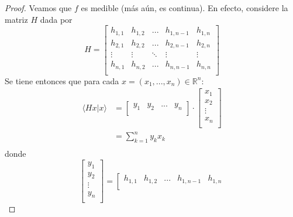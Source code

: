 \documentclass[12pt]{report}
\theoremstyle{largebreak}
\newcommand\pint[2]{\ensuremath{\langle#1| #2\rangle}}
\begin{document}
    \begin{proof}
        Veamos que $f$ es medible (más aún, es continua). En efecto, considere la matriz $H$ dada por
        \begin{equation*}
            H=\left[\begin{array}{ccccc}
                h_{1,1} & h_{1,2} & ... & h_{1,n-1} & h_{1,n}\\
                h_{2,1} & h_{2,2} & ... & h_{2,n-1} & h_{2,n}\\
                \vdots & \vdots & \ddots & \vdots & \vdots \\
                h_{n,1} & h_{n,2} & ... & h_{n,n-1} & h_{n,n}\\
            \end{array}\right]
        \end{equation*}
        Se tiene entonces que para cada $x=(x_1,...,x_n)\in\mathbb{R}^n$:
        \begin{equation*}
            \begin{split}
                \pint{Hx}{x}&=\left[
                    \begin{array}{cccc}
                        y_1 & y_2 & ... & y_n\\
                    \end{array}
                \right]\cdot\left[\begin{array}{c}
                    x_1\\
                    x_2\\
                    \vdots\\
                    x_n\\
                \end{array}\right]\\
                &=\sum_{ k=1}^n y_kx_k\\
            \end{split}
        \end{equation*}
        donde
        \begin{equation*}
            \left[\begin{array}{c}
                y_1\\
                y_2\\
                \vdots\\
                y_n\\
            \end{array}\right]=\left[\begin{array}{ccccc}
                h_{1,1} & h_{1,2} & ... & h_{1,n-1} & h_{1,n}\\

\end{array}
\end{equation*}
\end{proof}
\end{document}
